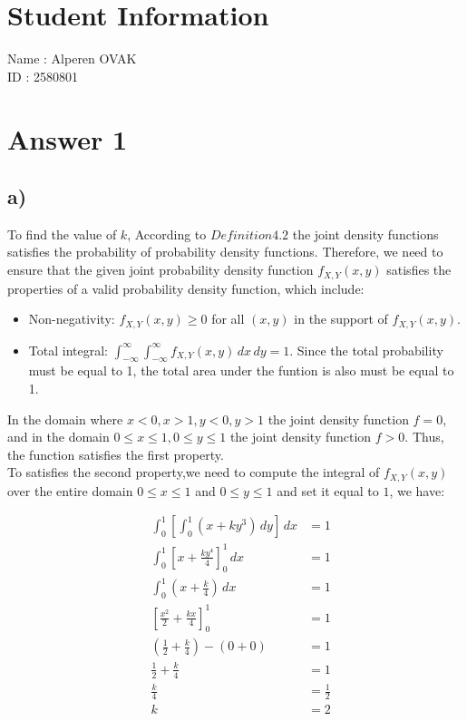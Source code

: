 \documentclass[12pt]{article}
\begin{document}
\section*{Student Information}

Name : Alperen OVAK \\

ID : 2580801\\


\section*{Answer 1}
\subsection*{a)} 

To find the value of $k$, According to $Definition 4.2 $ the joint density functions satisfies the probability of probability density functions. Therefore, we need to ensure that the given joint probability density function $f_{X,Y}(x,y)$ satisfies the properties of a valid probability density function, which include:
\begin{itemize}
    \item Non-negativity: $f_{X,Y}(x,y) \geq 0$ for all $(x,y)$ in the support of $f_{X,Y}(x,y)$.
    \item Total integral: $\int_{-\infty}^{\infty} \int_{-\infty}^{\infty} f_{X,Y}(x,y) \, dx \, dy = 1$. Since the total probability must be equal to 1, the total area under the funtion is also must be equal to 1.
\end{itemize}
In the domain where $ { x<0,x > 1,y < 0, y > 1 }$ the joint density function $ f=0 $, and in the domain $ {0 \leq x \leq 1, 0 \leq y \leq 1} $ the joint density function $ f > 0 $. Thus, the function satisfies the first property.\\

To satisfies the second property,we need to compute the integral of $f_{X,Y}(x,y)$ over the entire domain $0 \leq x \leq 1$ and $0 \leq y \leq 1$ and set it equal to $1$, we have:

\[
\begin{aligned}
&\int_{0}^{1} \left[ \int_{0}^{1} (x+ky^3) \, dy \right] \, dx &= 1 \\
&\int_{0}^{1} \left[ x + \frac{ky^4}{4} \right]_0^1 \, dx &= 1 \\
&\int_{0}^{1} \left( x + \frac{k}{4} \right) \, dx &= 1 \\
&\left[ \frac{x^2}{2} + \frac{kx}{4} \right]_0^1 &= 1 \\
&\left( \frac{1}{2} + \frac{k}{4} \right) - \left( 0 + 0 \right) &= 1 \\
&\frac{1}{2} + \frac{k}{4} &= 1 \\
&\frac{k}{4} &= \frac{1}{2} \\
&k &= 2 \\
\end{aligned}
\]
\end{document}
